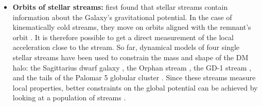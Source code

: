 \begin{itemize}

    \item \textbf{Orbits of stellar streams:} \citet{Johnston...MWstreams...1999} first found that stellar streams contain information about the Galaxy's gravitational potential. In the case of kinematically cold streams, they move on orbits aligned with the remnant's orbit \citep{Eyre...streamstheo...2011}. It is therefore possible to get a direct measurement of the local acceleration close to the stream. So far, dynamical models of four single stellar streams have been used to constrain the mass and shape of the \ac{DM} halo: the Sagittarius dwarf galaxy \citep{Law...sagstream...2010, Gibbons...sagstream...2014, Dierickx...sagstream..2017}, the Orphan stream \citep{Newberg...orphanstream..2010}, the GD-1 stream \citep{Koposov...GD1stream...2010, Bowden...GD1stream...2015, Malhan...GD1stream...2018}, and the tails of the Palomar 5 globular cluster \citep{Kupper...pal5stream...2015}. Since these streams measure local properties, better constraints on the global potential can be achieved by looking at a population of streams \citep{Bonaca...streamsinfo...2018}.
    

\end{itemize}

